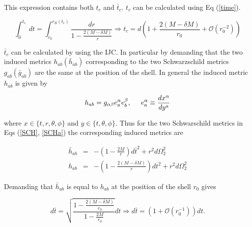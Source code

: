 \documentclass[aps,showpacs,onecolumn,floats,prd,superscriptaddress,nofootinbib]{revtex4-1}
\begin{document}

This expression contains both $t_c$ and $\bar{t}_c$. $t_c$ can be calculated using Eq (\ref{time}).

\begin{equation}
	\int^{t_c}_0 \ dt = \int^{r_B(t_c)}_{r_0} \frac{dr}{1 - \frac{2(M - \delta M)}{r}} \Rightarrow t_c = d \left( 1 + \frac{2(M - \delta M)}{r_0} + \mathcal{O}(r_0^{-2}) \right)	\label{tc}
\end{equation}

$\bar{t}_c$ can be calculated by using the IJC. In particular by demanding that the two induced metrics $h_{ab}(\bar{h}_{ab})$ corresponding to the two Schwarzschild metrics $g_{ab}(\bar{g}_{ab})$ are the same at the position of the shell. In general the induced metric $h_{ab}$ is given by

\begin{equation}
	h_{ab} = g_{\alpha \beta} e^\alpha_a e^\beta_b, \hspace{5mm} e^\alpha_a \equiv \frac{dx^\alpha}{dy^a}
\end{equation}

where $x \in \{t,r,\theta,\phi\}$ and $y\in \{t,\theta, \phi\}$. Thus for the two Schwarschild metrics in Eqs (\ref{SCH}, \ref{SCHa}) the corresponding induced metrics are

\begin{eqnarray}
	\bar{h}_{ab} & = & -\left( 1 - \frac{2M}{r} \right) d\bar{t}^2 + r^2 d \Omega_2^2	\nonumber	\\
	h_{ab} & = & -\left( 1 - \frac{2(M - \delta M)}{r} \right) dt^2 + r^2 d \Omega_2^2
\end{eqnarray}

Demanding that $\bar{h}_{ab}$ is equal to $h_{ab}$ at the position of the shell $r_0$ gives

\begin{equation}
	d\bar{t} = \sqrt{\frac{1 - \frac{2(M - \delta M)}{r_0}}{ 1- \frac{2M}{r_0}}} dt \Rightarrow d\bar{t} = \left( 1 + \mathcal{O}(r_0^{-1}) \right) dt.
\end{equation}
\end{document}

